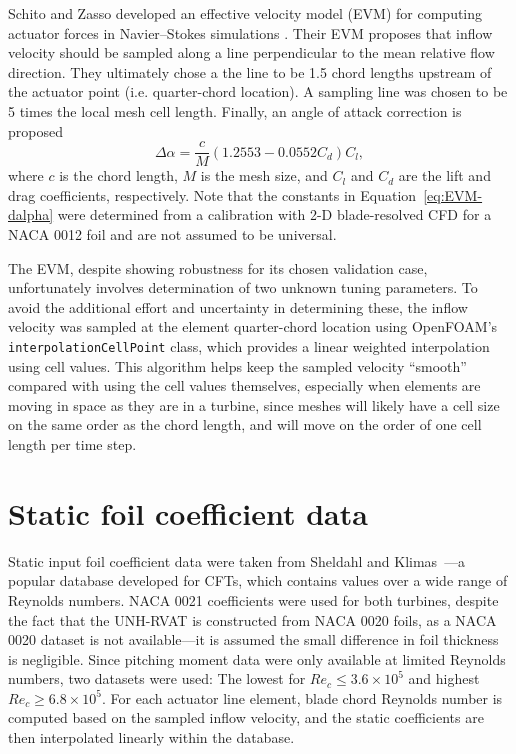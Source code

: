 Schito and Zasso developed an effective velocity model (EVM) for computing
actuator forces in Navier--Stokes simulations \cite{Schito2014}. Their EVM
proposes that inflow velocity should be sampled along a line perpendicular to
the mean relative flow direction. They ultimately chose a the line to be 1.5
chord lengths upstream of the actuator point (i.e. quarter-chord location). A
sampling line was chosen to be 5 times the local mesh cell length. Finally, an
angle of attack correction is proposed
\begin{equation}
    \Delta \alpha = \frac{c}{M} (1.2553 - 0.0552 C_d) C_l,
    \label{eq:EVM-dalpha}
\end{equation}
where $c$ is the chord length, $M$ is the mesh size, and $C_l$ and $C_d$ are the
lift and drag coefficients, respectively. Note that the constants in
Equation~\ref{eq:EVM-dalpha} were determined from a calibration with 2-D
blade-resolved CFD for a NACA 0012 foil and are not assumed to be universal.

The EVM, despite showing robustness for its chosen validation case,
unfortunately involves determination of two unknown tuning parameters. To avoid
the additional effort and uncertainty in determining these, the inflow velocity
was sampled at the element quarter-chord location using OpenFOAM's
\texttt{interpolationCellPoint} class, which provides a linear weighted
interpolation using cell values. This algorithm helps keep the sampled velocity
``smooth'' compared with using the cell values themselves, especially when
elements are moving in space as they are in a turbine, since meshes will likely
have a cell size on the same order as the chord length, and will move on the
order of one cell length per time step.


\section{Static foil coefficient data}

Static input foil coefficient data were taken from Sheldahl and
Klimas~\cite{Sheldahl1981}---a popular database developed for CFTs, which
contains values over a wide range of Reynolds numbers. NACA 0021 coefficients
were used for both turbines, despite the fact that the UNH-RVAT is constructed
from NACA 0020 foils, as a NACA 0020 dataset is not available---it is assumed
the small difference in foil thickness is negligible. Since pitching moment data
were only available at limited Reynolds numbers, two datasets were used: The
lowest for $Re_c \leq 3.6 \times 10^5$ and highest $Re_c \geq 6.8 \times 10^5$.
For each actuator line element, blade chord Reynolds number is computed based on
the sampled inflow velocity, and the static coefficients are then interpolated
linearly within the database.


